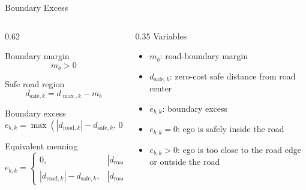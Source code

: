 \documentclass[aspectratio=169]{beamer}
\begin{document}
\begin{frame}{Boundary Excess}
\small
\begin{columns}[T,onlytextwidth]
\begin{column}{0.62\textwidth}
\begin{flushleft}
Boundary margin
\[
m_b > 0
\]

Safe road region
\[
d_{\mathrm{safe},k}
=
d_{\max,k}-m_b
\]

Boundary excess
\[
e_{b,k}
=
\max\left(|d_{\mathrm{road},k}|-d_{\mathrm{safe},k},\,0\right)
\]

Equivalent meaning
\[
e_{b,k}
=
\begin{cases}
0,
& |d_{\mathrm{road},k}| \le d_{\mathrm{safe},k}
\\[0.4em]
|d_{\mathrm{road},k}|-d_{\mathrm{safe},k},
& |d_{\mathrm{road},k}| > d_{\mathrm{safe},k}
\end{cases}
\]
\end{flushleft}
\end{column}

\begin{column}{0.35\textwidth}
Variables
\begin{itemize}
\setlength\itemsep{0.3em}
\item $m_b$: road-boundary margin
\item $d_{\mathrm{safe},k}$: zero-cost safe distance from road center
\item $e_{b,k}$: boundary excess
\item $e_{b,k}=0$: ego is safely inside the road
\item $e_{b,k}>0$: ego is too close to the road edge or outside the road
\end{itemize}
\end{column}
\end{columns}
\end{frame}
\end{document}
